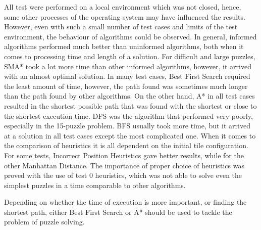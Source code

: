 \documentclass[12pt]{article}
\begin{document}
All test were performed on a local environment which was not closed, hence, some other processes of the operating system may have influenced the results. However, even with such a small number of test cases and limits of the test environment, the behaviour of algorithms could be observed. In general, informed algorithms performed much better than uninformed algorithms, both when it comes to processing time and length of a solution. For difficult and large puzzles, SMA* took a lot more time than other informed algorithms, however, it arrived with an almost optimal solution. In many test cases, Best First Search required the least amount of time, however, the path found was sometimes much longer than the path found by other algorithms. On the other hand, A* in all test cases resulted in the shortest possible path that was found with the shortest or close to the shortest execution time. DFS was the algorithm that performed very poorly, especially in the 15-puzzle problem. BFS usually took more time, but it arrived at a solution in all test cases except the most complicated one. When it comes to the comparison of heuristics it is all dependent on the initial tile configuration. For some tests, Incorrect Position Heuristics gave better results, while for the other Manhattan Distance. The importance of proper choice of heuristics was proved with the use of test 0 heuristics, which was not able to solve even the simplest puzzles in a time comparable to other algorithms.

Depending on whether the time of execution is more important, or finding the shortest path, either Best First Search or A* should be used to tackle the problem of puzzle solving.



\newpage
\listoffigures
\newpage
\printbibliography
\end{document}
